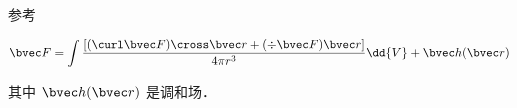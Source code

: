 
参考 \cite{GriffE}

\begin{equation}
\bvec F = \int \frac{[(\curl \bvec F)\cross \bvec r + (\div \bvec F)\bvec r]}{4\pi r^3} \dd{V} + \bvec h(\bvec r)
\end{equation}

其中 $\bvec h(\bvec r)$ 是调和场．
